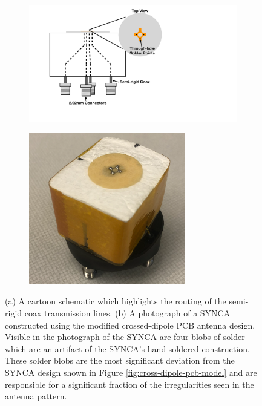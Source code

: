 \begin{figure}[h]
    \centering
    \begin{subfigure}[b]{0.48\textwidth}
        \centering
        \includegraphics[width=1\textwidth]{figs/Chapter-5/220916_antenna_cartoon.pdf}
        \caption{\label{fig:prototype-antenna-photo}}
    \end{subfigure}
    \hfill
    \begin{subfigure}[b]{0.48\textwidth}
        \centering
        \includegraphics[width=0.75\textwidth]{figs/Chapter-5/220727_synca_photo.png}
        \caption{\label{fig:prototype-antenna-cartoon}}
    \end{subfigure}
    \hfill
    \caption{\label{fig:prototype-antenna} (a) A cartoon schematic which highlights the routing of the semi-rigid coax transmission lines. (b) A photograph of a SYNCA constructed using the modified crossed-dipole PCB antenna design. Visible in the photograph of the SYNCA are four blobs of solder which are an artifact of the SYNCA's hand-soldered construction. These solder blobs are the most significant deviation from the SYNCA design shown in Figure \ref{fig:cross-dipole-pcb-model} and are responsible for a significant fraction of the irregularities seen in the antenna pattern.}
    \qquad
\end{figure}


